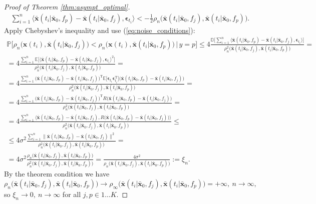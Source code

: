 \documentclass[referee, pdflatex, sn-mathphys-num]{sn-jnl}
\theoremstyle{definition}
\theoremstyle{plain}
\newcommand{\bx}{\ensuremath{\mathbf{x}}}
\newcommand{\bbx}{\ensuremath{\bar{\mathbf{x}}}}
\newcommand{\beps}{\ensuremath{\boldsymbol{\epsilon}}}
\begin{document}
\begin{appendices}
\begin{proof}[Proof of Theorem \ref{thm:asympt_optimal}]
\begin{gather*}
				\sum\limits_{i=1}^n \langle \bbx(t_i | \bbx_0, f_p) - \bbx(t_i | \bbx_0, f_j) , \beps_{t_i} \rangle < - \frac{1}{2} \rho_{n} \big( \bbx(t_i | \bbx_0, f_j), \bbx(t_i | \bbx_0, f_p) \big).
			\end{gather*}
			Apply Chebyshev's inequality and use (\ref{eq:noise_conditions}):
			\begin{multline*}
				\mathbb{P}\big[ \rho_n\big( \bx(t_i), \bbx(t_i | \bbx_0, f_j) \big) < \rho_n\big( \bx(t_i), \bbx(t_i | \bbx_0, f_p) \big) \,\big|\, y = p \big] \le 4 \frac{\mathbb{D}\big[ \sum\limits_{i=1}^n \langle \bbx(t_i | \bbx_0, f_p) - \bbx(t_i | \bbx_0, f_j) , \beps_{t_i} \rangle \big]}{\rho^2_{n} \big( \bbx(t_i | \bbx_0, f_j), \bbx(t_i | \bbx_0, f_p) \big)} = \\ = 4 \frac{\sum\limits_{i=1}^n \mathbb{E} \big[ \langle \bbx(t_i | \bbx_0, f_p) - \bbx(t_i | \bbx_0, f_j) , \beps_{t_i} \rangle^2 \big]}{\rho^2_{n} \big( \bbx(t_i | \bbx_0, f_j), \bbx(t_i | \bbx_0, f_p) \big)} = \\ = 4 \frac{\sum\limits_{i=1}^n \big( \bbx(t_i | \bbx_0, f_p) - \bbx(t_i | \bbx_0, f_j) \big)^{\text{T}} \mathbb{E} \big[ \beps_{t_i} \beps_{t_i}^{\text{T}} \big] \big( \bbx(t_i | \bbx_0, f_p) - \bbx(t_i | \bbx_0, f_j) \big)}{\rho^2_{n} \big( \bbx(t_i | \bbx_0, f_j), \bbx(t_i | \bbx_0, f_p) \big)} = \\ = 4 \frac{\sum\limits_{i=1}^n \big( \bbx(t_i | \bbx_0, f_p) - \bbx(t_i | \bbx_0, f_j) \big)^{\text{T}} R \big( \bbx(t_i | \bbx_0, f_p) - \bbx(t_i | \bbx_0, f_j) \big)}{\rho^2_{n} \big( \bbx(t_i | \bbx_0, f_j), \bbx(t_i | \bbx_0, f_p) \big)} = \\ = 4 \frac{\sum\limits_{i=1}^n \langle \bbx(t_i | \bbx_0, f_p) - \bbx(t_i | \bbx_0, f_j), R \big( \bbx(t_i | \bbx_0, f_p) - \bbx(t_i | \bbx_0, f_j) \big) \rangle}{\rho^2_{n} \big( \bbx(t_i | \bbx_0, f_j), \bbx(t_i | \bbx_0, f_p) \big)} \le \\ \le 4 \sigma^2 \frac{\sum\limits_{i=1}^n \lVert \bbx(t_i | \bbx_0, f_p) - \bbx(t_i | \bbx_0, f_j) \rVert^2}{\rho^2_{n} \big( \bbx(t_i | \bbx_0, f_j), \bbx(t_i | \bbx_0, f_p) \big)} = \\ = 4 \sigma^2 \frac{\rho_{n} \big( \bbx(t_i | \bbx_0, f_j), \bbx(t_i | \bbx_0, f_p) \big)}{\rho^2_{n} \big( \bbx(t_i | \bbx_0, f_j), \bbx(t_i | \bbx_0, f_p) \big)} = \frac{4 \sigma^2}{\rho_{n} \big( \bbx(t_i | \bbx_0, f_j), \bbx(t_i | \bbx_0, f_p) \big)} := \xi_n.
			\end{multline*}
			By the theorem condition we have
			\begin{equation*}
				\rho_{n} \big( \bbx(t_i | \bbx_0, f_j), \bbx(t_i | \bbx_0, f_p) \big) \to \rho_{\infty} \big( \bbx(t_i | \bbx_0, f_j), \bbx(t_i | \bbx_0, f_p) \big) = +\infty, \  n \to \infty,
			\end{equation*}
			so $\xi_n \to 0, \ n \to \infty$ for all $j,p \in 1 \ldots K$.
			

\end{proof}
\end{appendices}
\end{document}
